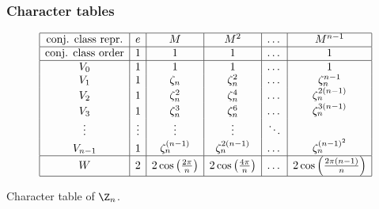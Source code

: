 \documentclass{worksheetclass}
\begin{document}
        \subsubsection{Character tables}

            \begin{table}[H]
                \centering
                {\small
                \begin{equation*}
                        \begin{array}{|c|c|c|c|c|c|}
                            \hline
                            \text{conj. class repr.} & e & M & M^2 & \dots & M^{n-1} \\ \hline
                            \text{conj. class order} & 1 & 1 & 1 & \dots & 1 \\
                            \hline
                            V_0 & 1 & 1 & 1 & \dots & 1 \\
                            V_1 & 1 & \zeta_n & \zeta^2_n & \dots & \zeta^{n-1}_n \\
                            V_2 & 1 & \zeta^2_n & \zeta^4_n & \dots & \zeta^{2(n-1)}_n \\
                            V_3 & 1 & \zeta^3_n & \zeta^6_n & \dots & \zeta^{3(n-1)}_n \\
                            \vdots & \vdots & \vdots & \vdots & \ddots &  \\
                            V_{n-1} & 1 & \zeta^{(n-1)}_n & \zeta^{2(n-1)}_n & \dots & \zeta^{(n-1)^2}_n \\ \hline
                            W & 2 & 2\cos\left(\frac{2\pi}{n}\right) & 2\cos\left(\frac{4\pi}{n}\right) & \dots & 2\cos\left(\frac{2\pi(n-1)}{n}\right) \\ \hline 
                            \end{array}
                    \end{equation*}}
                \caption{Character table of $\Z_n$.}
            \end{table}
\end{document}

